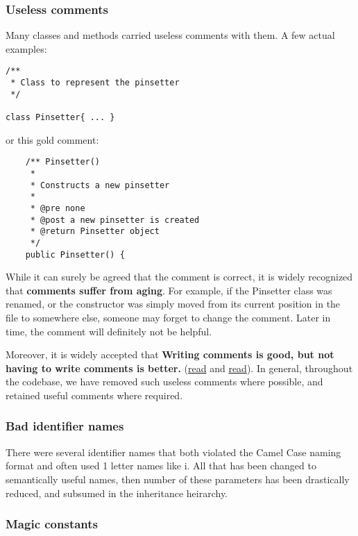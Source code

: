 \subsubsection{Useless comments}

Many classes and methods carried useless comments with them. A few actual examples:

\begin{verbatim}
/**
 * Class to represent the pinsetter
 */

class Pinsetter{ ... }
\end{verbatim}

or this gold comment:

\begin{verbatim}
	/** Pinsetter()
	 *
	 * Constructs a new pinsetter
	 *
	 * @pre none
	 * @post a new pinsetter is created
	 * @return Pinsetter object
	 */
	public Pinsetter() {
\end{verbatim}

While it can surely be agreed that the comment is correct, it is widely recognized that \textbf{comments suffer from aging}. For example, if the Pinsetter class was renamed, or the constructor was simply moved from its current position in the file to somewhere else, someone may forget to change the comment. Later in time, the comment will definitely not be helpful.

Moreover, it is widely accepted that \textbf{Writing comments is good, but not having to write comments is better.} (\hyperlink{https://softwareengineering.stackexchange.com/a/335513/131646}{read} and \hyperlink{https://www.freecodecamp.org/news/code-comments-the-good-the-bad-and-the-ugly-be9cc65fbf83/}{read}). In general, throughout the codebase, we have removed such useless comments where possible, and retained useful comments where required.

\subsubsection{Bad identifier names}

There were several identifier names that both violated the Camel Case naming format and often used 1 letter names like i. All that has been changed to semantically useful names, then number of these parameters has been drastically reduced, and subsumed in the inheritance heirarchy.

\subsubsection{Magic constants}

